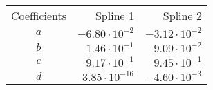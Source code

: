 \begin{tabular}{crr}
    \toprule
    Coefficients & Spline 1 & Spline 2 \\ \otoprule
    $a$ & $-6.80 \cdot 10^{-2}$ & $-3.12 \cdot 10^{-2}$ \\
    $b$ & $1.46 \cdot 10^{-1}$ & $9.09 \cdot 10^{-2}$ \\
    $c$ & $9.17 \cdot 10^{-1}$ & $9.45 \cdot 10^{-1}$ \\
    $d$ & $3.85 \cdot 10^{-16}$ & $-4.60 \cdot 10^{-3}$ \\
    \bottomrule
\end{tabular}
